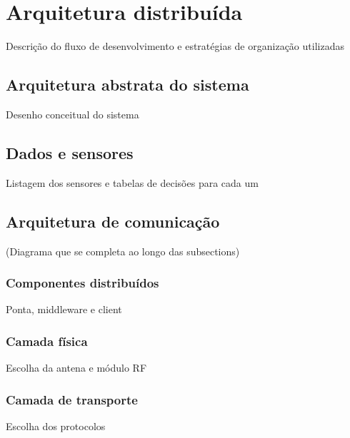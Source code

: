 \chapter{Arquitetura distribuída}
\label{chap:arquitetura-distribuida}

Descrição do fluxo de desenvolvimento e estratégias de organização utilizadas

\section{Arquitetura abstrata do sistema}
Desenho conceitual do sistema

\section{Dados e sensores}
Listagem dos sensores e tabelas de decisões para cada um

\section{Arquitetura de comunicação}
(Diagrama que se completa ao longo das subsections)

\subsection{Componentes distribuídos}
Ponta, middleware e client

\subsection{Camada física}
Escolha da antena e módulo RF

\subsection{Camada de transporte}
Escolha dos protocolos


